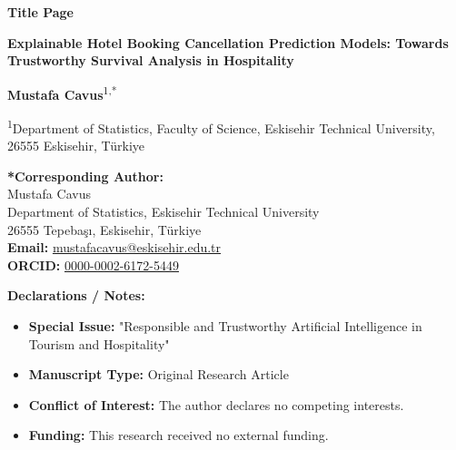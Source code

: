 \documentclass[12pt,a4paper]{article}
\begin{document}
\begin{center}
    \vspace*{1cm}
    
    {\LARGE \textbf{Title Page}}
    
    \vspace{1.5cm}
    
    {\Large \textbf{Explainable Hotel Booking Cancellation Prediction Models: Towards Trustworthy Survival Analysis in Hospitality}}
    
    \vspace{1.5cm}
    
    \textbf{Mustafa Cavus}\textsuperscript{1,*}
    
    \vspace{0.8cm}
    
    \textsuperscript{1}Department of Statistics, Faculty of Science, Eskisehir Technical University, 26555 Eskisehir, T\"urkiye
    
    \vspace{1.5cm}
    
    \textbf{*Corresponding Author:} \\
    Mustafa Cavus \\
    Department of Statistics, Eskisehir Technical University \\
    26555 Tepeba\c{s}\i, Eskisehir, T\"urkiye \\
    \textbf{Email:} \href{mailto:mustafacavus@eskisehir.edu.tr}{mustafacavus@eskisehir.edu.tr} \\
    \textbf{ORCID:} \href{https://orcid.org/0000-0002-6172-5449}{0000-0002-6172-5449}
    
    \vspace{2cm}
    
    \begin{minipage}{0.9\textwidth}
    \textbf{Declarations / Notes:}
    \begin{itemize}
        \item \textbf{Special Issue:} "Responsible and Trustworthy Artificial Intelligence in Tourism and Hospitality"
        \item \textbf{Manuscript Type:} Original Research Article
        \item \textbf{Conflict of Interest:} The author declares no competing interests.
        \item \textbf{Funding:} This research received no external funding.
    \end{itemize}
    \end{minipage}

\end{center}
\end{document}
